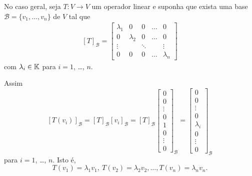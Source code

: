 \documentclass{beamer}
\begin{document}
    \begin{frame}
        No caso geral, seja $T : V \to V$ um operador linear e suponha que exista uma base $\mathcal{B} = \{v_1,\dots,v_n\}$ de $V$ tal que
        \begin{align}\label{formadiagonal}
            [T]_\mathcal{B} = \begin{bmatrix}
                \lambda_1 & 0 & 0 & \dots & 0\\
                0 & \lambda_2 & 0 & \dots & 0\\
                \vdots & & \ddots & & \vdots\\
                0 & 0 & 0 & \dots & \lambda_n
            \end{bmatrix}
        \end{align}
        com $\lambda_i \in \mathbb{K}$ para $i = 1$, \dots, $n$.
    \end{frame}

    \begin{frame}
        Assim
        \[
        [T(v_i)]_\mathcal{B} = [T]_\mathcal{B}[v_i]_\mathcal{B} = [T]_\mathcal{B}\begin{bmatrix}
            0\\
            0\\
            \vdots\\
            0\\
            1\\
            0\\
            \vdots\\
            0
        \end{bmatrix}_\mathcal{B} = \begin{bmatrix}
            0\\
            0\\
            \vdots\\
            0\\
            \lambda_i\\
            0\\
            \vdots\\
            0
        \end{bmatrix}_\mathcal{B}
        \]
        para $i = 1$, \dots, $n$. Isto é,
        \[
        T(v_1) = \lambda_1 v_1,\ T(v_2) = \lambda_2 v_2,\dots, T(v_n) = \lambda_n v_n.
        \]
    \end{frame}
\end{document}

